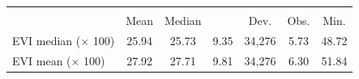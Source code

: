 {
\def\sym#1{\ifmmode^{#1}\else\(^{#1}\)\fi}
\begin{tabular}{l*{1}{cccccc}}
\toprule
                &\multicolumn{6}{c}{}                                       \\
                &   {Mean}& {Median}&     {St.&    Dev.}&   {Obs.}&   {Min.}\\
\midrule
EVI median ($\times$ 100)&    25.94&    25.73&     9.35&   34,276&     5.73&    48.72\\
EVI mean ($\times$ 100)&    27.92&    27.71&     9.81&   34,276&     6.30&    51.84\\
\bottomrule
\end{tabular}
}
